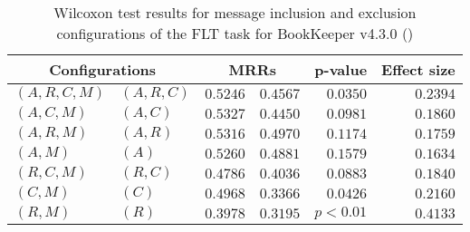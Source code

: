 
\begin{table}
\begin{spacing}{1.2}
\centering
\caption{Wilcoxon test results for message inclusion and exclusion configurations of the FLT task for BookKeeper v4.3.0 (\ctwo)}
\label{table:versus-wilcox-bookkeeper-flt-message}
\begin{tabular}{ll|rr|rr}
\toprule
      \multicolumn{2}{c|}{Configurations} &                \multicolumn{2}{c|}{MRRs} &        p-value & Effect size \\
\midrule
 $(A,R,C,M)$ &  $(A,R,C)$ &  $\bm{0.5246}$ &  $0.4567$ & $0.0350$ &    $0.2394$ \\
   $(A,C,M)$ &    $(A,C)$ &  $\bm{0.5327}$ &  $0.4450$ & $0.0981$ &    $0.1860$ \\
   $(A,R,M)$ &    $(A,R)$ &  $\bm{0.5316}$ &  $0.4970$ & $0.1174$ &    $0.1759$ \\
     $(A,M)$ &      $(A)$ &  $\bm{0.5260}$ &  $0.4881$ & $0.1579$ &    $0.1634$ \\
   $(R,C,M)$ &    $(R,C)$ &  $\bm{0.4786}$ &  $0.4036$ & $0.0883$ &    $0.1840$ \\
     $(C,M)$ &      $(C)$ &  $\bm{0.4968}$ &  $0.3366$ & $0.0426$ &    $0.2160$ \\
     $(R,M)$ &      $(R)$ &  $\bm{0.3978}$ &  $0.3195$ & $p<0.01$ &    $0.4133$ \\
\bottomrule
\end{tabular}

\end{spacing}
\end{table}

